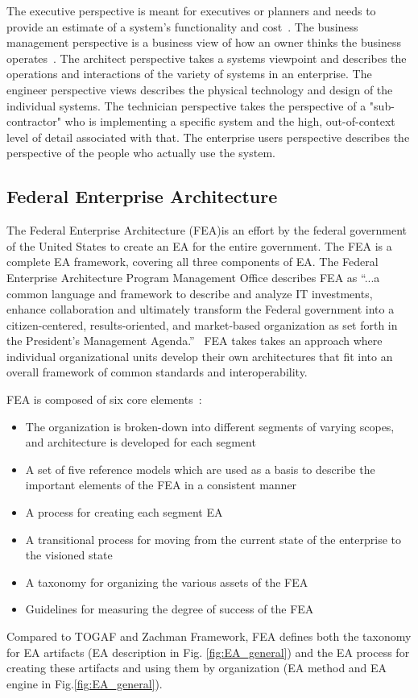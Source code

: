 The executive perspective is meant for executives or planners and needs to provide an estimate of a system's functionality and cost~\cite{jungle2004}. The business management perspective is a business view of how an owner thinks the business operates~\cite{Zachman2000}. The architect perspective takes a systems viewpoint and describes the operations and interactions of the variety of systems in an enterprise. The engineer perspective views describes the physical technology and design of the individual systems. The technician perspective takes the perspective of a "sub-contractor" who is implementing a specific system and the high, out-of-context level of detail associated with that. The enterprise users perspective describes the perspective of the people who actually use the system. 
 


\subsection{Federal Enterprise Architecture}
The Federal Enterprise Architecture (FEA)is an effort by the federal government of the United States to create an EA for the entire government. The FEA is a complete EA framework, covering all three components of EA. The Federal Enterprise Architecture Program Management Office describes FEA as ``...a common language and framework to describe and analyze IT investments, enhance collaboration and ultimately transform the Federal government into a citizen-centered, results-oriented, and market-based organization as set forth in the President's Management Agenda.''~\cite{FEA_PMO2007} FEA takes takes an approach where individual organizational units develop their own architectures that fit into an overall framework of common standards and interoperability.

FEA is composed of six core elements~\cite{sessions2007}:
\begin{itemize}
    \item The organization is broken-down into different segments of varying scopes, and architecture is developed for each segment
    \item A set of five reference models which are used as a basis to describe the important elements of the FEA in a consistent manner
    \item A process for creating each segment EA
    \item A transitional process for moving from the current state of the enterprise to the visioned state
    \item A taxonomy for organizing the various assets of the FEA
    \item Guidelines for measuring the degree of success of the FEA
\end{itemize}
Compared to TOGAF and Zachman Framework, FEA defines both the taxonomy for EA artifacts (EA description in Fig. \ref{fig:EA_general}) and the EA process for creating these artifacts and using them by organization (EA method and EA engine in Fig.\ref{fig:EA_general}). 

